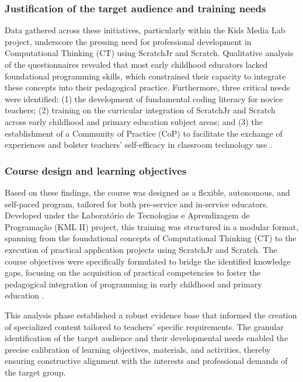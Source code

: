 \documentclass[english]{textolivre}
\begin{document}
\subsubsection{Justification of the target audience and training needs}\label{sec-idioma}
Data gathered across these initiatives, particularly within the Kids Media Lab project, underscore the pressing need for professional development in Computational Thinking (CT) using ScratchJr and Scratch. Qualitative analysis of the questionnaires revealed that most early childhood educators lacked foundational programming skills, which constrained their capacity to integrate these concepts into their pedagogical practice. Furthermore, three critical needs were identified: (1) the development of fundamental coding literacy for novice teachers; (2) training on the curricular integration of ScratchJr and Scratch across early childhood and primary education subject areas; and (3) the establishment of a Community of Practice (CoP) to facilitate the exchange of experiences and bolster teachers' self-efficacy in classroom technology use \cite{mirandapinto2017laboratory}.



\subsubsection{Course design and learning objectives}\label{sec-resumo}
Based on these findings, the course was designed as a flexible, autonomous, and self-paced program, tailored for both pre-service and in-service educators. Developed under the Laboratório de Tecnologias e Aprendizagem de Programação (KML II) project, this training was structured in a modular format, spanning from the foundational concepts of Computational Thinking (CT) to the execution of practical application projects using ScratchJr and Scratch. The course objectives were specifically formulated to bridge the identified knowledge gaps, focusing on the acquisition of practical competencies to foster the pedagogical integration of programming in early childhood and primary education \cite{mirandapinto2017laboratory}.

This analysis phase established a robust evidence base that informed the creation of specialized content tailored to teachers' specific requirements. The granular identification of the target audience and their developmental needs enabled the precise calibration of learning objectives, materials, and activities, thereby ensuring constructive alignment with the interests and professional demands of the target group.
\end{document}
